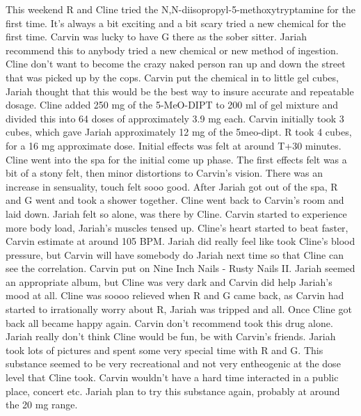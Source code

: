 \documentclass[12pt]{book}
\begin{document}
This weekend R and Cline tried the N,N-diisopropyl-5-methoxytryptamine for the first time. It's always a bit exciting and a bit scary tried a new chemical for the first time. Carvin was lucky to have G there as the sober sitter. Jariah recommend this to anybody tried a new chemical or new method of ingestion. Cline don't want to become the crazy naked person ran up and down the street that was picked up by the cops. Carvin put the chemical in to little gel cubes, Jariah thought that this would be the best way to insure accurate and repeatable dosage. Cline added 250 mg of the 5-MeO-DIPT to 200 ml of gel mixture and divided this into 64 doses of approximately 3.9 mg each. Carvin initially took 3 cubes, which gave Jariah approximately 12 mg of the 5meo-dipt. R took 4 cubes, for a 16 mg approximate dose. Initial effects was felt at around T+30 minutes. Cline went into the spa for the initial come up phase. The first effects felt was a bit of a stony felt, then minor distortions to Carvin's vision. There was an increase in sensuality, touch felt sooo good. After Jariah got out of the spa, R and G went and took a shower together. Cline went back to Carvin's room and laid down. Jariah felt so alone, was there by Cline. Carvin started to experience more body load, Jariah's muscles tensed up. Cline's heart started to beat faster, Carvin estimate at around 105 BPM. Jariah did really feel like took Cline's blood pressure, but Carvin will have somebody do Jariah next time so that Cline can see the correlation. Carvin put on Nine Inch Nails - Rusty Nails II. Jariah seemed an appropriate album, but Cline was very dark and Carvin did help Jariah's mood at all. Cline was soooo relieved when R and G came back, as Carvin had started to irrationally worry about R, Jariah was tripped and all. Once Cline got back all became happy again. Carvin don't recommend took this drug alone. Jariah really don't think Cline would be fun, be with Carvin's friends. Jariah took lots of pictures and spent some very special time with R and G. This substance seemed to be very recreational and not very entheogenic at the dose level that Cline took. Carvin wouldn't have a hard time interacted in a public place, concert etc. Jariah plan to try this substance again, probably at around the 20 mg range.
\end{document}
